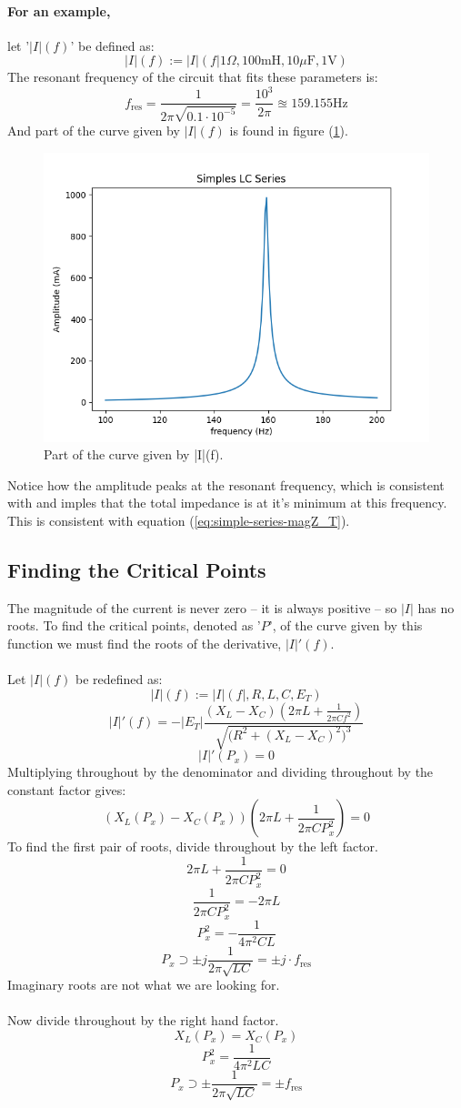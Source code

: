 \documentclass{article}
\begin{document}
	\paragraph[Example 1]{For an example,} let '$|I|(f)$' be defined as:
	$$ |I|(f):=|I|(f \vert 1\Omega, 100\text{mH}, 10\mu\text{F}, 1\text{V})$$
	The resonant frequency of the circuit that fits these parameters is:
	$$ f_{\text{res}} = \frac{1}{2\pi \sqrt{0.1 \cdot 10^{-5}}} = \frac{10^3}{2 
	\pi }\approxeq 159.155 \text{Hz}$$
	And part of the curve given by $|I|(f)$ is found in figure 
	(\ref{fig:simple-series}).
	\begin{figure}[h]
		\label{fig:simple-series}
		\centering
		\includegraphics[width=0.784\linewidth,height=0.588\linewidth]{simple-series}
		\caption{Part of the curve given by |I|(f).}
	\end{figure}
	Notice how the amplitude peaks at the resonant frequency, which is 
	consistent with and imples that the total impedance is at it's minimum at  
	this frequency.  This is consistent with equation 
	(\ref{eq:simple-series-magZ_T}).
	\subsection[CriticalPnts]{Finding the Critical Points}
	The magnitude of the current is never zero -- it is always positive -- so 
	$|I|$ has no roots.  To find the critical points, denoted as '$P$', of the 
	curve given by this 
	function we must find the roots of the derivative, $|I|'(f)$. \\ \\
	Let $|I|(f)$ be redefined as:
	$$ |I|(f):=|I|(f \vert, R, L, C, E_T)$$
	$$ |I|'(f)=-|E_T|\frac{(X_L-X_C)\left(2\pi L + \frac{1}{2\pi 
	Cf^2}\right)}{\sqrt{\big(R^2+(X_L-X_C)^2\big)^3}} $$
	$$ |I|'(P_x)=0$$
	Multiplying throughout by the denominator and dividing throughout by the 
	constant factor gives:
	$$ (X_L(P_x) - X_C(P_x))\left(2\pi L + \frac{1}{2\pi C P_x^2}\right)=0$$
	To find the first pair of roots, divide throughout by the left factor.
	$$ 2\pi L + \frac{1}{2\pi C P_x^2} = 0$$
	$$ \frac{1}{2\pi C P_x^2} = - 2\pi L$$
	$$ P_x^2 = - \frac{1}{4\pi^2 C L}$$
	$$ P_x \supset \pm j \frac{1}{2\pi \sqrt{LC}} = \pm j \cdot f_{\text{res}} 
	$$
	Imaginary roots are not what we are looking for. \\ \\
	Now divide throughout by the right hand factor.
	$$ X_L(P_x) = X_C(P_x)$$
	$$ P_x^2 = \frac{1}{4\pi^2LC}$$
	$$ P_x \supset \pm \frac{1}{2 \pi \sqrt{LC}} = \pm f_{\text{res}} $$
\end{document}
